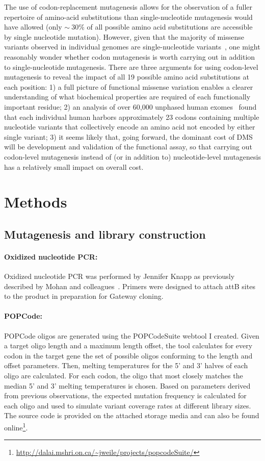 The use of codon-replacement mutagenesis allows for the observation of a fuller repertoire of amino-acid substitutions than single-nucleotide mutagenesis would have allowed (only $\sim~30\%$ of all possible amino acid substitutions are accessible by single nucleotide mutation).  However, given that the majority of missense variants observed in individual genomes are single-nucleotide variants~\cite{lek_analysis_2016}, one might reasonably wonder whether codon mutagenesis is worth carrying out in addition to single-nucleotide mutagenesis.  There are three arguments for using codon-level mutagenesis to reveal the impact of all 19 possible amino acid substitutions at each position:  1) a full picture of functional missense variation enables a clearer understanding of what biochemical properties are required of each functionally important residue; 2) an analysis of over 60,000 unphased human exomes~\cite{lek_analysis_2016} found that each individual human harbors approximately 23 codons containing multiple nucleotide variants that collectively encode an amino acid not encoded by either single variant; 3) it seems likely that, going forward, the dominant cost of DMS will be development and validation of the functional assay, so that carrying out codon-level mutagenesis instead of (or in addition to) nucleotide-level mutagenesis has a relatively small impact on overall cost.


\section{Methods}

\subsection{Mutagenesis and library construction}

\paragraph{Oxidized nucleotide PCR: } Oxidized nucleotide PCR was performed by Jennifer Knapp as previously described by Mohan and colleagues~\cite{mohan_pcr_2011}. Primers were designed to attach attB sites to the product in preparation for Gateway cloning.

\paragraph{POPCode:} POPCode oligos are generated using the POPCodeSuite webtool I created. Given a target oligo length and a maximum length offset, the tool calculates for every codon in the target gene the set of possible oligos conforming to the length and offset parameters. Then, melting temperatures for the 5' and 3' halves of each oligo are calculated. For each codon, the oligo that most closely matches the median 5' and 3' melting temperatures is chosen. Based on parameters derived from previous observations, the expected mutation frequency is calculated for each oligo and used to simulate variant coverage rates at different library sizes. The source code is provided on the attached storage media and can also be found online\footnote{
\url{http://dalai.mshri.on.ca/~jweile/projects/popcodeSuite/}
}.

